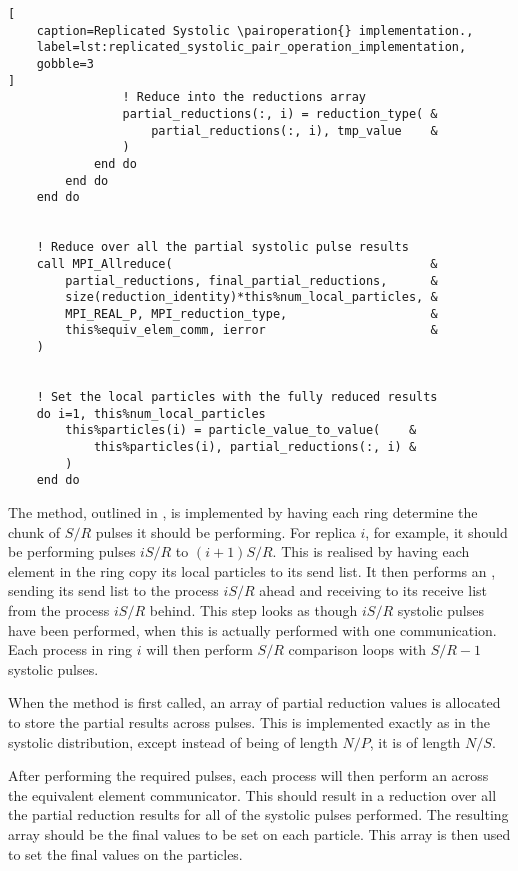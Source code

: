 \begin{lstlisting}[
    caption=Replicated Systolic \pairoperation{} implementation.,
    label=lst:replicated_systolic_pair_operation_implementation,
    gobble=3
]
                ! Reduce into the reductions array
                partial_reductions(:, i) = reduction_type( &
                    partial_reductions(:, i), tmp_value    &
                )
            end do
        end do
    end do


    ! Reduce over all the partial systolic pulse results
    call MPI_Allreduce(                                    &
        partial_reductions, final_partial_reductions,      &
        size(reduction_identity)*this%num_local_particles, &
        MPI_REAL_P, MPI_reduction_type,                    &
        this%equiv_elem_comm, ierror                       &
    )


    ! Set the local particles with the fully reduced results
    do i=1, this%num_local_particles
        this%particles(i) = particle_value_to_value(    &
            this%particles(i), partial_reductions(:, i) &
        )
    end do
\end{lstlisting}

The \pairoperation{} method, outlined in
,
is implemented by having each ring
determine the chunk of $S/R$ pulses it should be performing.
%
For replica $i$, for example, it should be performing pulses
$iS/R$ to $(i+1)S/R$.
%
This is realised by having each element in the ring copy its local
particles to its send list.
%
It then performs an \mpisendrecv{}, sending its send list to
the process $iS/R$ ahead and receiving to its receive list from
the process $iS/R$ behind.
%
This step looks as though $iS/R$ systolic pulses have been performed,
when this is actually performed with one communication.
%
Each process in ring $i$ will then perform $S/R$ comparison loops
with $S/R-1$ systolic pulses.

When the method is first called, an array of partial reduction
values is allocated to store the partial results across pulses.
%
This is implemented exactly as in the systolic distribution,
except instead of being of length $N/P$, it is of length $N/S$.

After performing the required pulses, each process will then perform
an \mpiallreduce{} across the equivalent element communicator.
%
This should result in a reduction over all the partial reduction
results for all of the systolic pulses performed.
%
The resulting array should be the final values to be set on each particle.
%
This array is then used to set the final values on the particles.
